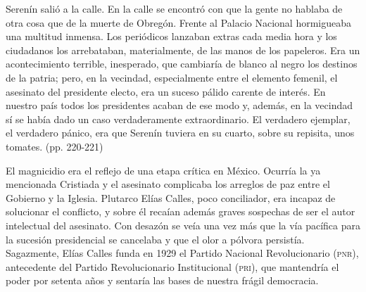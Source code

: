 \documentclass[14pt,twoside,final]{extbook} %
\begin{document}
\begin{quoting}
Serenín salió a la calle. En la calle se encontró con que la gente no hablaba de otra cosa que de la muerte de Obregón. Frente al Palacio Nacional hormigueaba una multitud inmensa. Los periódicos lanzaban extras cada media hora y los ciudadanos los arrebataban, materialmente, de las manos de los papeleros. Era un acontecimiento terrible, inesperado, que cambiaría de blanco al negro los destinos de la patria; pero, en la vecindad, especialmente entre el elemento femenil, el asesinato del presidente electo, era un suceso pálido carente de interés. En nuestro país todos los presidentes acaban de ese modo y, además, en la vecindad sí se había dado un caso verdaderamente extraordinario. El verdadero ejemplar, el verdadero pánico, era que Serenín tuviera en su cuarto, sobre su repisita, unos tomates. (pp. 220-221)
\end{quoting}
El magnicidio era el reflejo de una etapa crítica en México. Ocurría la ya mencionada Cristiada y el asesinato complicaba los arreglos de paz entre el Gobierno y la Iglesia. Plutarco Elías Calles, poco conciliador, era incapaz de solucionar el conflicto, y sobre él recaían además graves sospechas de ser el autor intelectual del asesinato. Con desazón se veía una vez más que la vía pacífica para la sucesión presidencial se cancelaba y que el olor a pólvora persistía. Sagazmente, Elías Calles funda en 1929 el Partido Nacional Revolucionario (\textsc{pnr}), antecedente del Partido Revolucionario Institucional (\textsc{pri}), que mantendría el poder por setenta años y sentaría las bases de nuestra frágil democracia.
\end{document}
